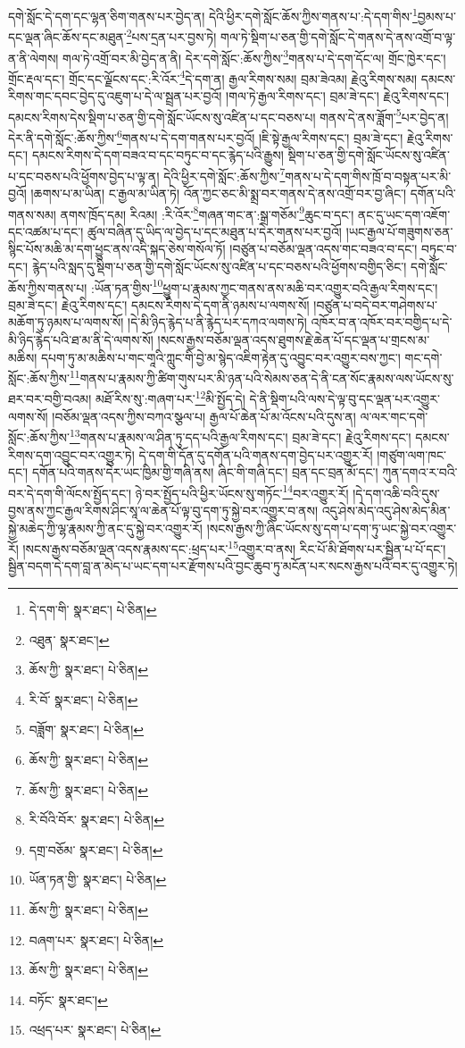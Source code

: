 དགེ་སློང་དེ་དག་དང་ལྷན་ཅིག་གནས་པར་བྱེད་ན། དེའི་ཕྱིར་དགེ་སློང་ཆོས་ཀྱིས་གནས་པ་:དེ་དག་གིས་\footnote{དེ་དག་གི་  སྣར་ཐང་།  པེ་ཅིན། }བྱམས་པ་དང་ལྡན་ཞིང་ཆོས་དང་མཐུན་\footnote{འཐུན་  སྣར་ཐང་། }པས་དྲན་པར་བྱས་ཏེ། གལ་ཏེ་སྡིག་པ་ཅན་གྱི་དགེ་སློང་དེ་གནས་དེ་ནས་འགྲོ་བ་ལྟ་ན་ནི་ལེགས། གལ་ཏེ་འགྲོ་བར་མི་བྱེད་ན་ནི། དེར་དགེ་སློང་:ཆོས་ཀྱིས་\footnote{ཆོས་ཀྱི་  སྣར་ཐང་།  པེ་ཅིན། }གནས་པ་དེ་དག་དོང་ལ། གྲོང་ཁྱེར་དང་། གྲོང་རྡལ་དང་། གྲོང་དང་ལྗོངས་དང་:རི་འོར་\footnote{རི་བོ་  སྣར་ཐང་།  པེ་ཅིན། }དེ་དག་ན། རྒྱལ་རིགས་སམ། བྲམ་ཟེའམ། རྗེའུ་རིགས་སམ། དམངས་རིགས་གང་དབང་བྱེད་དུ་འཇུག་པ་དེ་ལ་སྦྲན་པར་བྱའོ། །གལ་ཏེ་རྒྱལ་རིགས་དང་། བྲམ་ཟེ་དང་། རྗེའུ་རིགས་དང་། དམངས་རིགས་དེས་སྡིག་པ་ཅན་གྱི་དགེ་སློང་ཡོངས་སུ་འཛིན་པ་དང་བཅས་པ། གནས་དེ་ནས་ཟློག་\footnote{བཟློག་  སྣར་ཐང་།  པེ་ཅིན། }པར་བྱེད་ན། དེར་ནི་དགེ་སློང་:ཆོས་ཀྱིས་\footnote{ཆོས་ཀྱི་  སྣར་ཐང་།  པེ་ཅིན། }གནས་པ་དེ་དག་གནས་པར་བྱའོ། །ཇི་སྟེ་རྒྱལ་རིགས་དང་། བྲམ་ཟེ་དང་། རྗེའུ་རིགས་དང་། དམངས་རིགས་དེ་དག་བཟའ་བ་དང་བཏུང་བ་དང་རྙེད་པའི་རྒྱུས། སྡིག་པ་ཅན་གྱི་དགེ་སློང་ཡོངས་སུ་འཛིན་པ་དང་བཅས་པའི་ཕྱོགས་བྱེད་པ་ལྟ་ན། དེའི་ཕྱིར་དགེ་སློང་:ཆོས་ཀྱིས་\footnote{ཆོས་ཀྱི་  སྣར་ཐང་།  པེ་ཅིན། }གནས་པ་དེ་དག་གིས་ཁྲོ་བ་བསྟན་པར་མི་བྱའོ། །ཆགས་པ་མ་ཡིན། ང་རྒྱལ་མ་ཡིན་ཏེ། འོན་ཀྱང་ཅང་མི་སྨྲ་བར་གནས་དེ་ནས་འགྲོ་བར་བྱ་ཞིང་། དགོན་པའི་གནས་སམ། ནགས་ཁྲོད་དམ། རིའམ། :རི་འོར་\footnote{རི་བོའི་བོར་  སྣར་ཐང་།  པེ་ཅིན། }གཞན་གང་ན་:སྒྲ་གཅོམ་\footnote{དགྲ་བཅོམ་  སྣར་ཐང་།  པེ་ཅིན། }ཆུང་བ་དང་། ནང་དུ་ཡང་དག་འཇོག་དང་འཚམ་པ་དང་། ཚུལ་བཞིན་དུ་ཡིད་ལ་བྱེད་པ་དང་མཐུན་པ་དེར་གནས་པར་བྱའོ། །ཡང་རྒྱལ་པོ་གཟུགས་ཅན་སྙིང་པོས་མཆི་མ་དག་ཕྱུང་ནས་འདི་སྐད་ཅེས་གསོལ་ཏོ། །བཙུན་པ་བཅོམ་ལྡན་འདས་གང་བཟའ་བ་དང་། བཏུང་བ་དང་། རྙེད་པའི་སླད་དུ་སྡིག་པ་ཅན་གྱི་དགེ་སློང་ཡོངས་སུ་འཛིན་པ་དང་བཅས་པའི་ཕྱོགས་བགྱིད་ཅིང་། དགེ་སློང་ཆོས་ཀྱིས་གནས་པ། :ཡོན་ཏན་གྱིས་\footnote{ཡོན་ཏན་གྱི་  སྣར་ཐང་།  པེ་ཅིན། }ཕྱུག་པ་རྣམས་ཀྱང་གནས་ནས་མཆི་བར་འགྱུར་བའི་རྒྱལ་རིགས་དང་། བྲམ་ཟེ་དང་། རྗེའུ་རིགས་དང་། དམངས་རིགས་དེ་དག་ནི་ཉམས་པ་ལགས་སོ། །བཙུན་པ་བདེ་བར་གཤེགས་པ་མཆོག་ཏུ་ཉམས་པ་ལགས་སོ། །དེ་མི་ཉིད་རྙེད་པ་ནི་རྙེད་པར་དཀའ་ལགས་ཏེ། འཁོར་བ་ན་འཁོར་བར་བགྱིད་པ་དེ་མི་ཉིད་རྙེད་པའི་ཐ་མ་ནི་དེ་ལགས་སོ། །སངས་རྒྱས་བཅོམ་ལྡན་འདས་ཐུགས་རྗེ་ཆེན་པོ་དང་ལྡན་པ་གྲངས་མ་མཆིས། དཔག་ཏུ་མ་མཆིས་པ་གང་གཱའི་ཀླུང་གི་བྱེ་མ་སྙེད་འཇིག་རྟེན་དུ་འབྱུང་བར་འགྱུར་བས་ཀྱང་། གང་དགེ་སློང་:ཆོས་ཀྱིས་\footnote{ཆོས་ཀྱི་  སྣར་ཐང་།  པེ་ཅིན། }གནས་པ་རྣམས་ཀྱི་ཚིག་གུས་པར་མི་ཉན་པའི་སེམས་ཅན་དེ་ནི་ངན་སོང་རྣམས་ལས་ཡོངས་སུ་ཐར་བར་བགྱི་བའམ། མཐོ་རིས་སུ་:གཞག་པར་\footnote{བཞག་པར་  སྣར་ཐང་།  པེ་ཅིན། }མི་སྤྱོད་དེ། དེ་ནི་སྡིག་པའི་ལས་དེ་ལྟ་བུ་དང་ལྡན་པར་འགྱུར་ལགས་སོ། །བཅོམ་ལྡན་འདས་ཀྱིས་བཀའ་སྩལ་པ། རྒྱལ་པོ་ཆེན་པོ་མ་འོངས་པའི་དུས་ན། ལ་ལར་གང་དགེ་སློང་:ཆོས་ཀྱིས་\footnote{ཆོས་ཀྱི་  སྣར་ཐང་།  པེ་ཅིན། }གནས་པ་རྣམས་ལ་ཤིན་ཏུ་དད་པའི་རྒྱལ་རིགས་དང་། བྲམ་ཟེ་དང་། རྗེའུ་རིགས་དང་། དམངས་རིགས་དག་འབྱུང་བར་འགྱུར་ཏེ། དེ་དག་གི་དོན་དུ་དགོན་པའི་གནས་དག་བྱེད་པར་འགྱུར་རོ། །གཙུག་ལག་ཁང་དང་། དགོན་པའི་གནས་དེར་ཡང་ཁྱིམ་གྱི་གཞི་ནས། ཞིང་གི་གཞི་དང་། བྲན་དང་བྲན་མོ་དང་། ཀུན་དགའ་ར་བའི་བར་དེ་དག་གི་ལོངས་སྤྱོད་དང་། ཉེ་བར་སྤྱོད་པའི་ཕྱིར་ཡོངས་སུ་གཏོང་\footnote{བཏོང་  སྣར་ཐང་། }བར་འགྱུར་རོ། །དེ་དག་འཆི་བའི་དུས་བྱས་ནས་ཀྱང་རྒྱལ་རིགས་ཤིང་སཱ་ལ་ཆེན་པོ་ལྟ་བུ་དག་ཏུ་སྐྱེ་བར་འགྱུར་བ་ནས། འདུ་ཤེས་མེད་འདུ་ཤེས་མེད་མིན་སྐྱེ་མཆེད་ཀྱི་ལྷ་རྣམས་ཀྱི་ནང་དུ་སྐྱེ་བར་འགྱུར་རོ། །སངས་རྒྱས་ཀྱི་ཞིང་ཡོངས་སུ་དག་པ་དག་ཏུ་ཡང་སྐྱེ་བར་འགྱུར་རོ། །སངས་རྒྱས་བཅོམ་ལྡན་འདས་རྣམས་དང་:ཕྲད་པར་\footnote{འཕྲད་པར་  སྣར་ཐང་།  པེ་ཅིན། }འགྱུར་བ་ནས། རིང་པོ་མི་ཐོགས་པར་སྦྱིན་པ་པོ་དང་། སྦྱིན་བདག་དེ་དག་བླ་ན་མེད་པ་ཡང་དག་པར་རྫོགས་པའི་བྱང་ཆུབ་ཏུ་མངོན་པར་སངས་རྒྱས་པའི་བར་དུ་འགྱུར་ཏེ། 